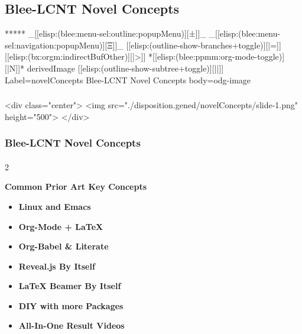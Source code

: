 \begin{whenOrg}
\section{Blee-LCNT Novel Concepts}


\begin{whenOrg}
*****  _[[elisp:(blee:menu-sel:outline:popupMenu)][±]]_ _[[elisp:(blee:menu-sel:navigation:popupMenu)][Ξ]]_ [[elisp:(outline-show-branches+toggle)][|=]] [[elisp:(bx:orgm:indirectBufOther)][|>]] *[[elisp:(blee:ppmm:org-mode-toggle)][|N]]*  derivedImage [[elisp:(outline-show-subtree+toggle)][||]] Label=novelConcepts Blee-LCNT Novel Concepts body=odg-image
\end{whenOrg}

\begin{htmlonly}

\begin{frame}[fragile,plain,label=novelConcepts]
    \frametitle{}
    \framesubtitle{}
    \begin{rawhtml}
<div class="center">
<img src="./disposition.gened/novelConcepts/slide-1.png" height="500">
</div>
    \end{rawhtml}
\end{frame}
\end{htmlonly}

\begin{verblatex}

\begin{frame}[fragile,plain,label=novelConcepts]
    \frametitle{Blee-LCNT Novel Concepts}
    \framesubtitle{}

   \begin{multicols}{2}

     \color{magenta} \textbf{Common Prior Art Key Concepts}

      \begin{itemize}
        \item \color{black} \textbf{Linux and Emacs}
        \item \color{violet} \textbf{Org-Mode + LaTeX}
        \item \color{violet} \textbf{Org-Babel \& Literate}
        \item \color{violet}  \textbf{Reveal.js By Itself}
        \item \color{violet}  \textbf{LaTeX Beamer By Itself}
        \item \color{violet}  \textbf{DIY with more Packages}
        \item \color{violet}  \textbf{All-In-One Result Videos}


\end{itemize}
\end{multicols}
\end{frame}
\end{verblatex}
\end{whenOrg}
